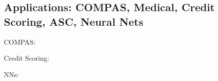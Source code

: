 \documentclass[]{report}
\theoremstyle{definition}
\begin{document}

\subsection{Applications: COMPAS, Medical, Credit Scoring, ASC, Neural Nets}

COMPAS:

Credit Scoring:

NNs:

\printbibliography
\end{document}
